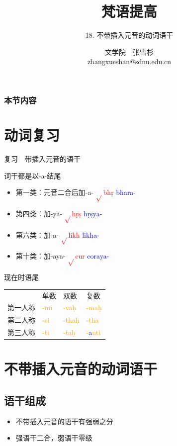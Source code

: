 \documentclass[17pt]{beamer}
\title{{梵语提高}}
\subtitle{18. 不带插入元音的动词语干}
\author[张雪杉]{文学院~~张雪杉 \\ zhangxueshan@sdnu.edu.cn}
\date{}
\newcommand{\verbroot}[1]{\textcolor{red}{$\sqrt{}$#1}}
\newcommand{\verbstem}[1]{\textcolor{blue}{#1\nobreakdash-}}
\newcommand{\wordending}[1]{\textcolor{Orange}{\nobreakdash-#1}}
\newcommand{\important}[1]{\textcolor{blue}{#1}}
\begin{document}
\begin{frame}
  \titlepage
\end{frame}

\begin{frame}
  \frametitle{本节内容}
  \tableofcontents
\end{frame}

\section{动词复习}
\begin{frame}{复习~~带插入元音的语干}
  \small
  \raggedright
  词干都是以\nobreakdash-a\nobreakdash-结尾
  \begin{itemize}
    \item 第一类：元音二合后加\nobreakdash-a\nobreakdash-
    \verbroot{bhṛ}  \verbstem{bhara}
    \item 第四类：加\nobreakdash-ya\nobreakdash-
    \verbroot{hṛṣ}  \verbstem{hṛṣya}
    \item 第六类：加\nobreakdash-a\nobreakdash-
    \verbroot{likh}  \verbstem{likha}
    \item 第十类：加\nobreakdash-aya\nobreakdash-
    \verbroot{cur}  \verbstem{coraya}
    \end{itemize}
\end{frame}

\begin{frame}{现在时语尾}
  \centering
  \begin{tabular}{@{}llll@{}} %
    & 单数  & 双数  & 复数 \\
    第一人称 & \wordending{mi} & \wordending{vaḥ}  & \wordending{maḥ}  \\
    第二人称 & \wordending{si} & \wordending{thaḥ} & \wordending{tha}  \\
    第三人称 & \wordending{ti} & \wordending{taḥ} & \wordending{\important{a}nti}  \\
  \end{tabular}   
\end{frame}

\section{不带插入元音的动词语干}
\begin{frame}{\insertsection }
    \tableofcontents[currentsection]
\end{frame}

\subsection{语干组成}
\begin{frame}{\insertsubsection }
  \begin{itemize}
    \item 不带插入元音的语干有强弱之分
    \item 强语干二合，弱语干零级
  \end{itemize}
\end{frame}
\end{document}
